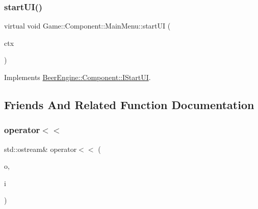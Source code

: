 \mbox{\label{class_game_1_1_component_1_1_main_menu_ae50614def462ca82eb6c4404ee82a82e}} 
\subsubsection{\texorpdfstring{start\+U\+I()}{startUI()}}
{\footnotesize\ttfamily virtual void Game\+::\+Component\+::\+Main\+Menu\+::start\+UI (\begin{DoxyParamCaption}\item[{struct nk\+\_\+context $\ast$}]{ctx }\end{DoxyParamCaption})\hspace{0.3cm}{\ttfamily [virtual]}}



Implements \mbox{\hyperlink{class_beer_engine_1_1_component_1_1_i_start_u_i_a95b739f21079f5f103da42ea34f826f2}{Beer\+Engine\+::\+Component\+::\+I\+Start\+UI}}.



\subsection{Friends And Related Function Documentation}
\mbox{\label{class_game_1_1_component_1_1_main_menu_a5405b4cd58a968c2e49d52e780287476}} 
\subsubsection{\texorpdfstring{operator$<$$<$}{operator<<}}
{\footnotesize\ttfamily std\+::ostream\& operator$<$$<$ (\begin{DoxyParamCaption}\item[{std\+::ostream \&}]{o,  }\item[{\mbox{\hyperlink{class_game_1_1_component_1_1_main_menu}{Main\+Menu}} const \&}]{i }\end{DoxyParamCaption})\hspace{0.3cm}{\ttfamily [friend]}}



